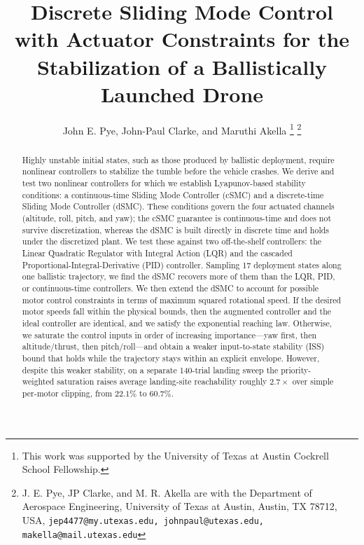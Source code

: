 \documentclass[conf]{new-aiaa}
\title{Discrete Sliding Mode Control with Actuator Constraints for the Stabilization of a Ballistically Launched Drone}
\author{John E. Pye, John-Paul Clarke, and Maruthi Akella%
\footnote{This work was supported by the University of Texas at Austin Cockrell School Fellowship.}%
\footnote{J. E. Pye, JP Clarke, and M. R. Akella are with the Department of Aerospace Engineering, University of Texas at Austin, Austin, TX 78712, USA,
{\tt\small jep4477@my.utexas.edu, johnpaul@utexas.edu, makella@mail.utexas.edu}}}
\affil{Department of Aerospace Engineering, University of Texas at Austin, Austin, TX 78712, USA}
\begin{document}
\maketitle

\begin{abstract}
Highly unstable initial states, such as those produced by ballistic deployment, require nonlinear controllers to stabilize the tumble before the vehicle crashes. We derive and test two nonlinear controllers for which we establish Lyapunov-based stability conditions: a continuous-time Sliding Mode Controller (cSMC) and a discrete-time Sliding Mode Controller (dSMC). These conditions govern the four actuated channels (altitude, roll, pitch, and yaw); the cSMC guarantee is continuous-time and does not survive discretization, whereas the dSMC is built directly in discrete time and holds under the discretized plant. We test these against two off-the-shelf controllers: the Linear Quadratic Regulator with Integral Action (LQR) and the cascaded Proportional-Integral-Derivative (PID) controller. Sampling 17 deployment states along one ballistic trajectory, we find the dSMC recovers more of them than the LQR, PID, or continuous-time controllers. We then extend the dSMC to account for possible motor control constraints in terms of maximum squared rotational speed. If the desired motor speeds fall within the physical bounds, then the augmented controller and the ideal controller are identical, and we satisfy the exponential reaching law. Otherwise, we saturate the control inputs in order of increasing importance---yaw first, then altitude/thrust, then pitch/roll---and obtain a weaker input-to-state stability (ISS) bound that holds while the trajectory stays within an explicit envelope. However, despite this weaker stability, on a separate 140-trial landing sweep the priority-weighted saturation raises average landing-site reachability roughly $2.7\times$ over simple per-motor clipping, from $22.1\%$ to $60.7\%$.
\end{abstract}
\end{document}
